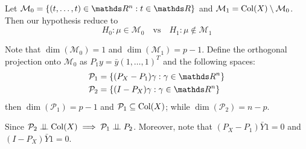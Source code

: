 \documentclass[12pt]{extarticle}
\begin{document}
Let $\mathcal M_0 = \{ (t, \dots, t) \in \R^n : t \in \R \}$ and $\mathcal M_1= {\operatorfont Col}(X) \setminus \mathcal M_0$.
Then our hypothesis reduce to
\begin{equation}
	H_0: \mu \in \mathcal M_0 \quad \text{vs} \quad H_1: \mu \notin \mathcal M_1
\end{equation}

Note that $\dim(\mathcal M_0) = 1$ and $\dim(\mathcal M_1) = p-1$.
Define the orthogonal projection onto $\mathcal M_0$ as $P_1 y = \bar y (1, \dots, 1)^T$
and the following spaces:
\begin{align}
	\mathcal P_1 & = \{ (P_X - P_1)\gamma : \gamma \in \R^n \} \\
	\mathcal P_2 & = \{ (I - P_X)\gamma : \gamma \in \R^n \}
\end{align}
then $\dim(\mathcal P_1) = p-1$ and $\mathcal P_1  \subseteq {\operatorfont Col}(X)$;
while $\dim(\mathcal P_2) = n - p$.

Since $\mathcal P_2 \indep {\operatorfont Col}(X) \implies \mathcal P_1 \indep P_2$.
Moreover, note that $(P_X - P_1) \bar Y1 = 0$ and $(I - P_X) \bar Y1 = 0$.
\end{document}

